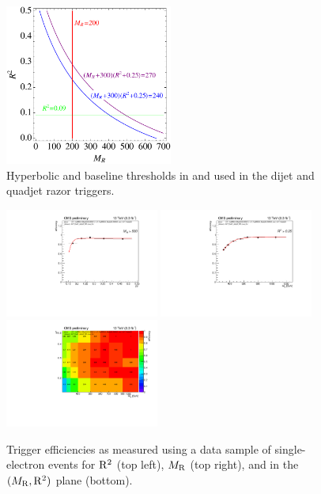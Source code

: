 \begin{figure}[htb!]
\centering
\includegraphics[width=0.49\textwidth]{figs/hlt13TeV/HLTRsqMR.pdf}
\caption{\label{fig:hyperbolic} Hyperbolic and baseline thresholds in
  \Rtwo and \MR used in the dijet and quadjet razor triggers.}
\end{figure}

\begin{figure}[ht!]
\centering
\includegraphics[width=0.45\textwidth]{figs/hlt13TeV/turnons_2015_no100GeVmuons_thesis/HLT_RsqMR240_Rsq0p09_MR200_HLT_RsqMR240_Rsq0p09_MR200_4jet_HLT_Rsq0p25_HLT_Ele27_eta2p1_WPLoose_Gsf_effRsq_MR500.pdf}
\includegraphics[width=0.45\textwidth]{figs/hlt13TeV/turnons_2015_no100GeVmuons_thesis/HLT_RsqMR240_Rsq0p09_MR200_HLT_RsqMR240_Rsq0p09_MR200_4jet_HLT_Rsq0p25_HLT_Ele27_eta2p1_WPLoose_Gsf_effMR_Rsq0p25.pdf}\\
\includegraphics[width=0.45\textwidth]{figs/hlt13TeV/turnons_2015_no100GeVmuons_thesis/HLT_RsqMR240_Rsq0p09_MR200_HLT_RsqMR240_Rsq0p09_MR200_4jet_HLT_Rsq0p25_HLT_Ele27_eta2p1_WPLoose_Gsf_eff2D.pdf}
\caption{\label{fig:turnons} Trigger efficiencies as measured using a
  data sample of single-electron events for $\mathrm{R}^2$ (top
  left), $M_\mathrm{R}$ (top right), and in the $(M_\mathrm{R},\mathrm{R}^2)$ plane (bottom).}
\end{figure}

